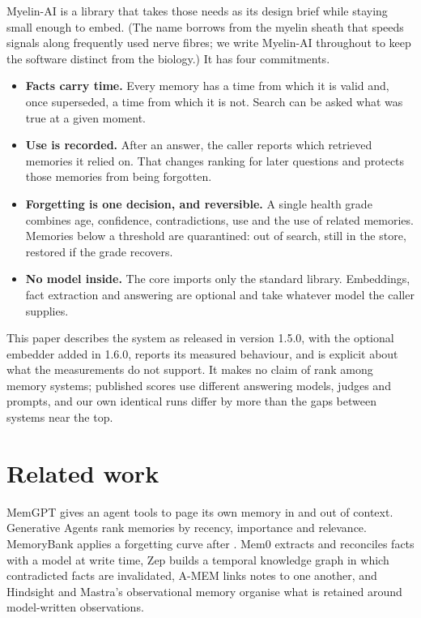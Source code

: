 \documentclass[11pt]{article}
\begin{document}
\mbox{Myelin-AI} is a library that takes those needs as its design brief while
staying small enough to embed. (The name borrows from the myelin sheath
that speeds signals along frequently used nerve fibres; we write
\mbox{Myelin-AI} throughout to keep the software distinct from the
biology.) It has four commitments.

\begin{itemize}
\item \textbf{Facts carry time.} Every memory has a time from which it
  is valid and, once superseded, a time from which it is not. Search
  can be asked what was true at a given moment.
\item \textbf{Use is recorded.} After an answer, the caller reports
  which retrieved memories it relied on. That changes ranking for later
  questions and protects those memories from being forgotten.
\item \textbf{Forgetting is one decision, and reversible.} A single
  health grade combines age, confidence, contradictions, use and the
  use of related memories. Memories below a threshold are quarantined:
  out of search, still in the store, restored if the grade recovers.
\item \textbf{No model inside.} The core imports only the standard
  library. Embeddings, fact extraction and answering are optional and
  take whatever model the caller supplies.
\end{itemize}

This paper describes the system as released in version 1.5.0, with
the optional embedder added in 1.6.0, reports
its measured behaviour, and is explicit about what the measurements do
not support. It makes no claim of rank among memory systems; published
scores use different answering models, judges and prompts, and our own
identical runs differ by more than the gaps between systems near the
top.

\section{Related work}

MemGPT \citep{packer2023memgpt} gives an agent tools to page its own
memory in and out of context. Generative Agents
\citep{park2023generative} rank memories by recency, importance and
relevance. MemoryBank \citep{zhong2024memorybank} applies a forgetting
curve after \citet{ebbinghaus1885}. Mem0 \citep{chhikara2025mem0}
extracts and reconciles facts with a model at write time, Zep
\citep{rasmussen2025zep} builds a temporal knowledge graph in which
contradicted facts are invalidated, A-MEM \citep{xu2025amem} links
notes to one another, and Hindsight \citep{hindsight2025} and Mastra's
observational memory \citep{mastra2026om} organise what is retained
around model-written observations.
\end{document}
